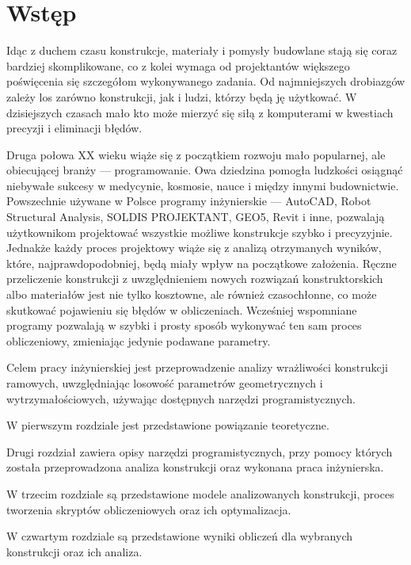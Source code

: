 \newpage
{}
\section*{Wstęp}

Idąc z duchem czasu konstrukcje, materiały i pomysły budowlane stają się coraz bardziej skomplikowane, co z kolei wymaga
od projektantów większego poświęcenia się szczegółom wykonywanego zadania. Od najmniejszych drobiazgów zależy los
zarówno konstrukcji, jak i ludzi, którzy będą ję użytkować. W dzisiejszych czasach mało kto może mierzyć się siłą z
komputerami w kwestiach precyzji i eliminacji błędów.

Druga połowa XX wieku wiąże się z początkiem rozwoju mało popularnej, ale obiecującej branży — programowanie.
Owa dziedzina pomogła ludzkości osiągnąć niebywałe sukcesy w medycynie, kosmosie, nauce i między innymi budownictwie.
Powszechnie używane w Polsce programy inżynierskie — AutoCAD, Robot Structural Analysis, SOLDIS PROJEKTANT, GEO5, Revit i inne,
pozwalają użytkownikom projektować wszystkie możliwe konstrukcje szybko i precyzyjnie. Jednakże każdy proces projektowy wiąże się z
analizą otrzymanych wyników, które, najprawdopodobniej, będą miały wpływ na początkowe założenia. Ręczne przeliczenie konstrukcji z
uwzględnieniem nowych rozwiązań konstruktorskich albo materiałów jest nie tylko kosztowne, ale również czasochłonne, co może skutkować
pojawieniu się błędów w obliczeniach. Wcześniej wspomniane programy pozwalają w szybki i prosty sposób wykonywać ten sam
proces obliczeniowy, zmieniając jedynie podawane parametry.

Celem pracy inżynierskiej jest przeprowadzenie analizy wrażliwości konstrukcji ramowych, uwzględniając losowość
parametrów geometrycznych i wytrzymałościowych, używając dostępnych narzędzi programistycznych.

W pierwszym rozdziale jest przedstawione powiązanie teoretyczne.

Drugi rozdział zawiera opisy narzędzi programistycznych, przy pomocy których została przeprowadzona analiza konstrukcji
oraz wykonana praca inżynierska.

W trzecim rozdziale są przedstawione modele analizowanych konstrukcji, proces tworzenia skryptów obliczeniowych oraz
ich optymalizacja.

W czwartym rozdziale są przedstawione wyniki obliczeń dla wybranych konstrukcji oraz ich analiza.
